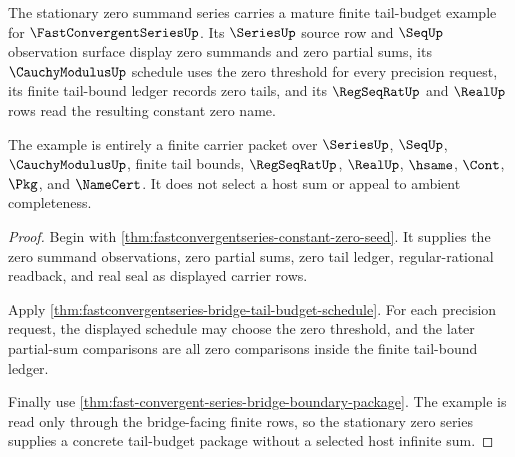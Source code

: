 \begin{theorem}
\label{thm:fastconvergentseries-tail-budget-example}
The stationary zero summand series carries a mature finite tail-budget example for $\FastConvergentSeriesUp$. Its $\SeriesUp$ source row and $\SeqUp$ observation surface display zero summands and zero partial sums, its $\CauchyModulusUp$ schedule uses the zero threshold for every precision request, its finite tail-bound ledger records zero tails, and its $\RegSeqRatUp$ and $\RealUp$ rows read the resulting constant zero name.

The example is entirely a finite carrier packet over $\SeriesUp$, $\SeqUp$, $\CauchyModulusUp$, finite tail bounds, $\RegSeqRatUp$, $\RealUp$, $\hsame$, $\Cont$, $\Pkg$, and $\NameCert$. It does not select a host sum or appeal to ambient completeness.
\end{theorem}
\begin{proof}
Begin with \autoref{thm:fastconvergentseries-constant-zero-seed}. It supplies the zero summand observations, zero partial sums, zero tail ledger, regular-rational readback, and real seal as displayed carrier rows.

Apply \autoref{thm:fastconvergentseries-bridge-tail-budget-schedule}. For each precision request, the displayed schedule may choose the zero threshold, and the later partial-sum comparisons are all zero comparisons inside the finite tail-bound ledger.

Finally use \autoref{thm:fast-convergent-series-bridge-boundary-package}. The example is read only through the bridge-facing finite rows, so the stationary zero series supplies a concrete tail-budget package without a selected host infinite sum.
\end{proof}

